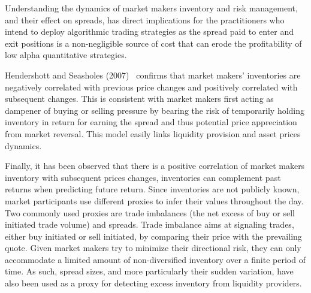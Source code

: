 Understanding the dynamics of market makers inventory and risk management, and their effect on spreads, has direct implications for the practitioners who intend to deploy algorithmic trading strategies as the spread paid to enter and exit positions is a non-negligible source of cost that can erode the profitability of low alpha quantitative strategies. 


Hendershott and Seasholes (2007)~\cite{hendersea} confirms that market makers' inventories are negatively correlated with previous price changes and positively correlated with subsequent changes. This is consistent with market makers first acting as dampener of buying or selling pressure by bearing the risk of temporarily holding inventory in return for earning the spread and thus potential price appreciation from market reversal. This model easily links liquidity provision and asset prices dynamics. 


Finally, it has been observed that there is a positive correlation of market makers inventory with subsequent prices changes, inventories can complement past returns when predicting future return. Since inventories are not publicly known, market participants use different proxies to infer their values throughout the day. Two commonly used proxies are trade imbalances (the net excess of buy or sell initiated trade volume) and spreads. Trade imbalance aims at signaling trades, either buy initiated or sell initiated, by comparing their price with the prevailing quote. Given market makers try to minimize their directional risk, they can only accommodate a limited amount of non-diversified inventory over a finite period of time. As such, spread sizes, and more particularly their sudden variation, have also been used as a proxy for detecting excess inventory from liquidity providers.




